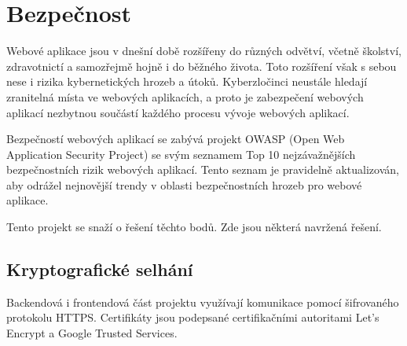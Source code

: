 \chapter{Bezpečnost}
Webové aplikace jsou v dnešní době rozšířeny do různých odvětví, včetně školství, zdravotnictí a samozřejmě hojně i do běžného života. Toto rozšíření však s sebou nese i rizika kybernetických hrozeb a útoků. Kyberzločinci neustále hledají zranitelná místa ve webových aplikacích, a proto je zabezpečení webových aplikací nezbytnou součástí každého procesu vývoje webových aplikací. \par
Bezpečností webových aplikací se zabývá projekt OWASP \cite{owasp}(Open Web Application Security Project) se svým seznamem Top 10 nejzávažnějších \cite{owasp10} bezpečnostních rizik webových aplikací. Tento seznam je pravidelně aktualizován, aby odrážel nejnovější trendy v oblasti bezpečnostních hrozeb pro webové aplikace.\par
Tento projekt se snaží o řešení těchto bodů. Zde jsou některá navržená řešení.\par
\section{Kryptografické selhání}
Backendová i frontendová část projektu využívají komunikace pomocí šifrovaného protokolu HTTPS. Certifikáty jsou podepsané certifikačními autoritami Let's Encrypt a Google Trusted Services.